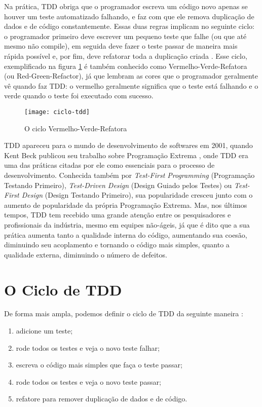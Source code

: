 Na prática, TDD obriga que o programador escreva
um código novo apenas se houver um teste automatizado falhando, e faz com que ele remova duplicação de dados e de código constantemente. 
Essas duas regras implicam no seguinte ciclo: o programador primeiro deve escrever um pequeno teste que falhe (ou que até mesmo não compile), 
em seguida deve fazer o teste passar de maneira mais rápida possível e, por fim, deve refatorar toda a duplicação criada \cite{TDDByExample}. 
Esse ciclo, exemplificado na figura \ref{fig:red-green-refactor} é também conhecido como 
Vermelho-Verde-Refatora (ou Red-Green-Refactor), já que lembram as cores que o programador geralmente 
vê quando faz TDD: o vermelho geralmente significa que o teste está falhando e o verde quando o teste foi executado com sucesso.

\begin{figure}
  \centering
  \texttt{[image: ciclo-tdd]}
  \caption{O ciclo Vermelho-Verde-Refatora}
  \label{fig:red-green-refactor}
\end{figure}

TDD apareceu para o mundo de desenvolvimento de softwares em 2001, quando Kent Beck publicou seu trabalho sobre Programação Extrema \cite{XPExplained},
onde TDD era uma das práticas citadas por ele como essenciais para o processo de desenvolvimento. Conhecida também
por \textit{Test-First Programming} (Programação Testando Primeiro), \textit{Test-Driven Design} (Design Guiado pelos Testes) ou 
\textit{Test-First Design} (Design Testando Primeiro), sua popularidade cresceu junto com o aumento de popularidade da própria Programação Extrema. 
Mas, nos últimos tempos, TDD tem recebido uma grande atenção entre os pesquisadores e profissionais da indústria, mesmo em equipes não-ágeis, já que
é dito que a sua prática aumenta tanto a qualidade interna do código, aumentando sua coesão, diminuindo seu acoplamento e tornando
o código mais simples, quanto a qualidade externa, diminuindo o número de defeitos.

\section{O Ciclo de TDD} 
\label{sec:tdd-ciclo}

De forma mais ampla, podemos definir o ciclo de TDD da seguinte maneira \cite{TDDByExample}:

\begin{enumerate}
	\item adicione um teste; 
	\item rode todos os testes e veja o novo teste falhar; 
	\item escreva o código mais simples que faça o teste passar; 
	\item rode todos os testes e veja o novo teste passar; 
	\item refatore para remover duplicação de dados e de código.
\end{enumerate}

